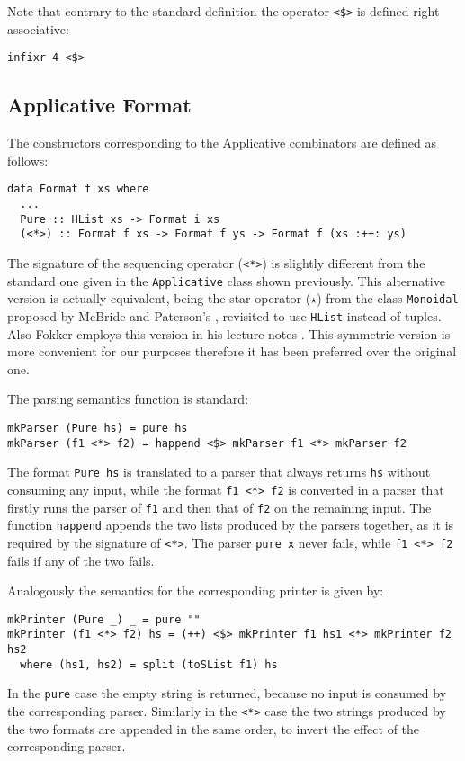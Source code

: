 \documentclass[../Thesis.tex]{subfiles}
\begin{document}
Note that contrary to the standard definition the operator \texttt{<\$>} is defined right associative:

\begin{verbatim}
infixr 4 <$>
\end{verbatim}

\subsection{Applicative Format}
\label{subsec:ApplicativeFormat}
The constructors corresponding to the Applicative combinators are defined as follows:

\begin{verbatim}
data Format f xs where
  ...
  Pure :: HList xs -> Format i xs
  (<*>) :: Format f xs -> Format f ys -> Format f (xs :++: ys)
\end{verbatim}

The signature of the sequencing operator (\texttt{<*>}) is slightly different from the standard 
one given in the \texttt{Applicative} class shown previously.
This alternative version is actually equivalent, being the star 
operator (\texttt{$\star$}) from the class \texttt{Monoidal} proposed by McBride and Paterson’s 
\cite{Mcbride08Ape}, revisited to use \texttt{HList} instead of tuples.
Also Fokker employs this version in his lecture notes 
\cite{Fokker}.
This symmetric version is more convenient for our purposes therefore it has been preferred over the original one.

The parsing semantics function is standard:
\begin{verbatim}
mkParser (Pure hs) = pure hs
mkParser (f1 <*> f2) = happend <$> mkParser f1 <*> mkParser f2
\end{verbatim} 
The format \texttt{Pure hs} is translated to a parser that always returns \texttt{hs} without consuming any input, while the format
\texttt{f1 <*> f2} is converted in a parser that firstly runs the parser of \texttt{f1} and then that of \texttt{f2} on the remaining input. The function \texttt{happend} appends the two lists produced by the parsers together, as it is required by the signature of \texttt{<*>}.
The parser \texttt{pure x} never fails, while \texttt{f1 <*> f2}
fails if any of the two fails.

Analogously the semantics for the corresponding printer is given by:
\begin{verbatim}
mkPrinter (Pure _) _ = pure ""
mkPrinter (f1 <*> f2) hs = (++) <$> mkPrinter f1 hs1 <*> mkPrinter f2 hs2
  where (hs1, hs2) = split (toSList f1) hs
\end{verbatim} 
In the \texttt{pure} case the empty string is returned, because no input is consumed by the corresponding parser.
Similarly in the \texttt{<*>} case the two strings produced by the two formats are appended in the same order, to invert the effect of the corresponding parser.
\end{document}
